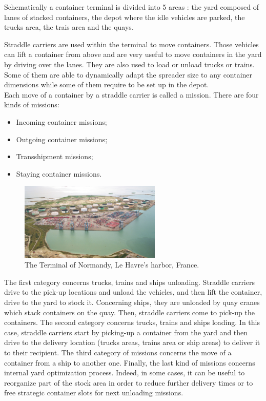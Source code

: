 \documentclass[a4paper,12pt]{article}
\begin{document}
Schematically a container terminal is divided into 5 areas : the yard composed of lanes of stacked containers, the depot where the idle vehicles are parked, the trucks area, the trais area and the quays.

Straddle carriers are used within the terminal to move containers. Those vehicles can lift a container from above and are very useful to move containers in the yard by driving over the lanes. They are also used to load or unload trucks or trains. Some of them are able to dynamically adapt the spreader size to any container dimensions while some of them require to be set up in the depot.\\%


Each move of a container by a straddle carrier is called a mission. There are four kinds of missions:
\begin{itemize}
	\item Incoming container missions;
	\item Outgoing container missions;
	\item Transshipment missions;
	\item Staying container missions.
\end{itemize}

\begin{figure}[ht]
  \begin{center}
  \includegraphics[width=0.6\textwidth]{Figures/terminalOfNormandy}
  \caption{The Terminal of Normandy, Le Havre's harbor, France.}
\end{center}
\end{figure}


The first category concerns trucks, trains and ships unloading. Straddle carriers drive to the pick-up locations and unload the vehicles, and then lift the container, drive to the yard to stock it. Concerning ships, they are unloaded by quay cranes which stack containers on the quay. Then, straddle carriers come to pick-up the containers.
The second category concerns trucks, trains and ships loading. In this case, straddle carriers start by picking-up a container from the yard and then drive to the delivery location (trucks areas, trains area or ship areas) to deliver it to their recipient. 
The third category of missions concerns the move of a container from a ship to another one.
Finally, the last kind of missions concerns internal yard optimization process. Indeed, in some cases, it can be useful to reorganize part of the stock area in order to reduce further delivery times or to free strategic container slots for next unloading missions.\\
\end{document}

